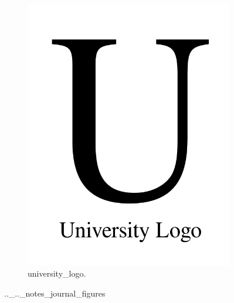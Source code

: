 \begin{figure}[!htbp]
   \centering
\begin{subfigure}[t]{0.48\textwidth}
   \includegraphics[width=\textwidth,center]{university_logo.png}
   \caption{university_logo.}
   \label{fig:.._.._notes_journal_figures-a}
\end{subfigure}
   \caption{.._.._notes_journal_figures}
   \label{fig:.}
\end{figure}